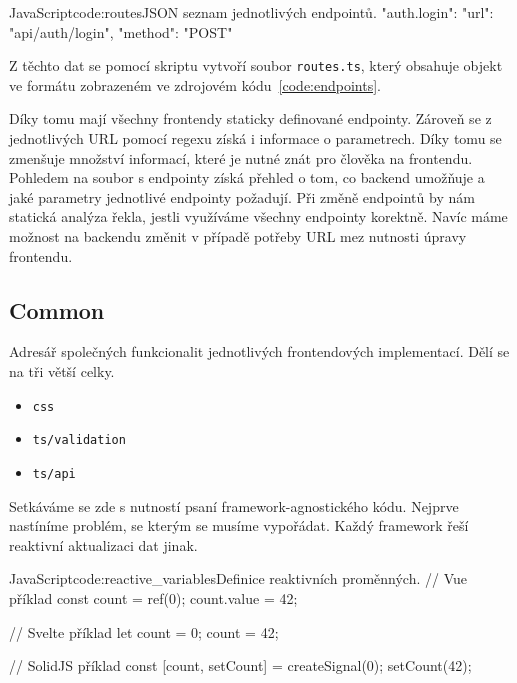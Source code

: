 \documentclass[
  master,
  program=ainf,
  tables=false,
  sourcecodes,
  glossaries,
  index
]{kidiplom}
\begin{document}
\begin{kicode}{JavaScript}{code:routes}{JSON seznam jednotlivých endpointů.}
{
  "auth.login":{
    "url": "api/auth/login",
    "method": "POST"
  }
}
\end{kicode}


Z těchto dat se pomocí skriptu vytvoří soubor {\tt routes.ts}, který obsahuje objekt ve formátu zobrazeném 
ve zdrojovém kódu~\ref{code:endpoints}.


Díky tomu mají všechny frontendy staticky definované endpointy. Zároveň se z
jednotlivých URL pomocí regexu získá i informace o parametrech. Díky tomu 
se zmenšuje množství informací, které je nutné znát pro člověka na frontendu.
Pohledem na soubor s endpointy získá přehled o tom, co backend umožňuje a jaké
parametry jednotlivé endpointy požadují. Při změně endpointů by nám statická analýza
řekla, jestli využíváme všechny endpointy korektně. Navíc máme možnost na backendu
změnit v případě potřeby URL mez nutnosti úpravy frontendu.

\subsection{Common}
Adresář společných funkcionalit jednotlivých frontendových implementací. Dělí se
na tři větší celky.

\begin{itemize}
  \item {\tt css}
  \item {\tt ts/validation}
  \item {\tt ts/api}
\end{itemize}

Setkáváme se zde s nutností psaní framework-agnostického kódu. Nejprve
nastíníme problém, se kterým se musíme vypořádat. Každý framework řeší
reaktivní aktualizaci dat jinak.

\begin{kicode}{JavaScript}{code:reactive_variables}{Definice reaktivních proměnných.}
  // Vue příklad
  const count = ref(0);
  count.value = 42;

  // Svelte příklad
  let count = 0;
  count = 42;

  // SolidJS příklad
  const [count, setCount] = createSignal(0);
  setCount(42);
\end{kicode}
\end{document}
